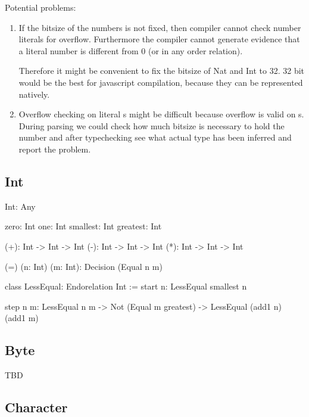 Potential problems:
\begin{enumerate}
\item If the bitsize of the numbers is not fixed, then compiler cannot check
  number literals for overflow. Furthermore the compiler cannot generate
  evidence that a literal number is different from 0 (or in any order
  relation).

  Therefore it might be convenient to fix the bitsize of Nat and Int to 32. 32
  bit would be the best for javascript compilation, because they can be
  represented natively.


\item Overflow checking on literal s might be difficult because
  overflow is valid on s. During parsing we could check how much
  bitsize is necessary to hold the number and after typechecking see what
  actual type has been inferred and report the problem.
\end{enumerate}








\subsection{Int}

\begin{alba}
    Int: Any

    zero: Int
    one:  Int
    smallest: Int
    greatest: Int

    (+): Int -> Int -> Int
    (-): Int -> Int -> Int
    (*): Int -> Int -> Int

    (=) (n: Int) (m: Int): Decision (Equal n m)

    class
        LessEqual: Endorelation Int
    :=
        start {n}:
            LessEqual smallest n

        step {n m}:
            LessEqual n m
            -> Not (Equal m greatest)
            -> LessEqual (add1 n) (add1 m)
\end{alba}





\vskip 5mm
\subsection{Byte}

TBD




\subsection{Character}

